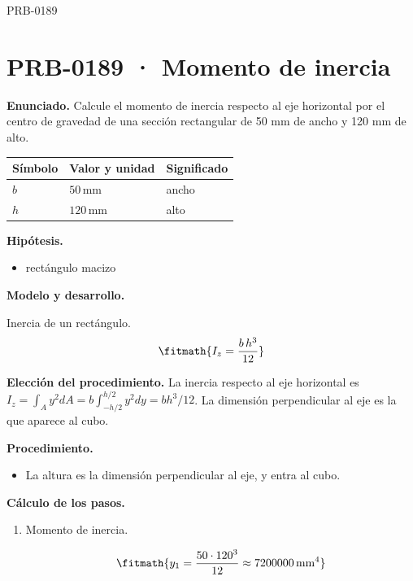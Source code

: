 \Needspace{.3\textheight}

\begin{studiumworked}{PRB-0189}

\section{PRB-0189 · Momento de inercia}

\textbf{Enunciado.} Calcule el momento de inercia respecto al eje horizontal por el centro de gravedad de una sección rectangular de 50 mm de ancho y 120 mm de alto.

\par\medskip\noindent\begin{tabular}{@{}p{.18\linewidth}p{.26\linewidth}p{.48\linewidth}@{}}
\toprule Símbolo & Valor y unidad & Significado\\\midrule
$b$ & $50\,\mathrm{mm}$ & ancho\\
$h$ & $120\,\mathrm{mm}$ & alto\\
\bottomrule\end{tabular}\par\medskip

\textbf{Hipótesis.}\begin{itemize}\item rectángulo macizo\end{itemize}

\textbf{Modelo y desarrollo.}

Inercia de un rectángulo.\[\fitmath{I_z = \frac{b\,h^{3}}{12}}\]

\textbf{Elección del procedimiento.} La inercia respecto al eje horizontal es $I_z=\int_A y^2dA=b\int_{-h/2}^{h/2}y^2dy=bh^3/12$. La dimensión perpendicular al eje es la que aparece al cubo.

\textbf{Procedimiento.}\begin{itemize}\item La altura es la dimensión perpendicular al eje, y entra al cubo.\end{itemize}

\textbf{Cálculo de los pasos.}

\begin{enumerate}

\item Momento de inercia.

\[\fitmath{y_{1}=\frac{50\cdot {120}^{3}}{12}\approx 7200000\,\mathrm{mm^{4}}}\]

\end{enumerate}


\end{studiumworked}
